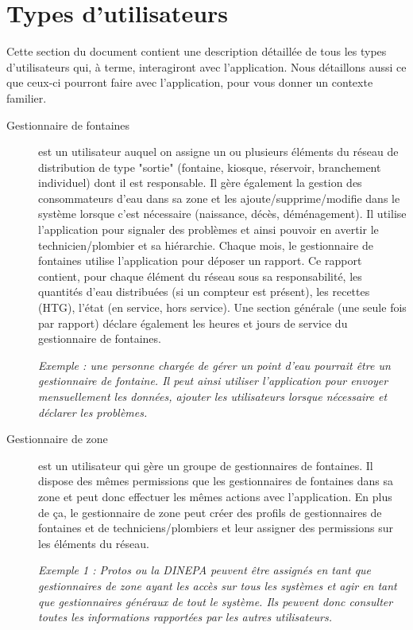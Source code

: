 \documentclass[a4paper, 11pt]{article}
\begin{document}
\section{Types d'utilisateurs}
Cette section du document contient une description détaillée de tous les types d'utilisateurs qui, à terme, interagiront avec l'application. Nous détaillons aussi ce que ceux-ci pourront faire avec l'application, pour vous donner un contexte familier.

  \begin{description}
    \item[Gestionnaire de fontaines] est un utilisateur auquel on assigne un ou plusieurs éléments du réseau de distribution de type "sortie" (fontaine, kiosque, réservoir, branchement individuel) dont il est responsable.
    Il gère également la gestion des consommateurs d'eau dans sa zone et les ajoute/supprime/modifie dans le système lorsque c'est nécessaire (naissance, décès, déménagement).
    Il utilise l'application pour signaler des problèmes et ainsi pouvoir en avertir le technicien/plombier et sa hiérarchie. Chaque mois, le gestionnaire de fontaines utilise l'application pour déposer un rapport. Ce rapport contient, pour chaque élément du réseau sous sa responsabilité, les quantités d'eau distribuées (si un compteur est présent), les recettes (HTG), l'état (en service, hors service). Une section générale (une seule fois par rapport) déclare également les heures et jours de service du gestionnaire de fontaines.

    \emph{Exemple : une personne chargée de gérer un point d'eau pourrait être un gestionnaire de fontaine. Il peut ainsi utiliser l'application pour envoyer mensuellement les données, ajouter les utilisateurs lorsque nécessaire et déclarer les problèmes.}

    \item[Gestionnaire de zone] est un utilisateur qui gère un groupe de gestionnaires de fontaines. Il dispose des mêmes permissions que les gestionnaires de fontaines dans sa zone et peut donc effectuer les mêmes actions avec l'application. En plus de ça, le gestionnaire de zone peut créer des profils de gestionnaires de fontaines et de techniciens/plombiers et leur assigner des permissions sur les éléments du réseau. %

    \emph{Exemple 1 : Protos ou la DINEPA peuvent être assignés en tant que gestionnaires de zone ayant les accès sur tous les systèmes et agir en tant que gestionnaires généraux de tout le système. Ils peuvent donc consulter toutes les informations rapportées par les autres utilisateurs.}


\end{description}
\end{document}
